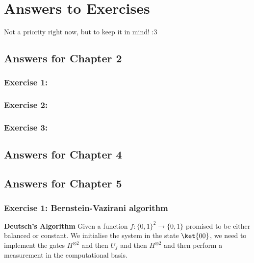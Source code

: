 \chapter{Answers to Exercises}
\label{chpt:answers}

Not a priority right now, but to keep it in mind! :3

\section{Answers for Chapter 2}

\subsection{Exercise 1:}
\subsection{Exercise 2:}
\subsection{Exercise 3:}

\newpage
\section{Answers for Chapter 4}

\newpage
\section{Answers for Chapter 5}


\subsection{Exercise 1: Bernstein-Vazirani algorithm}

\begin{tcolorbox}[standard jigsaw,
    opacityback=0,  %
    boxrule=0.5pt]
    {\bf Deutsch's Algorithm}
    \tcbline
    Given a function $f:\{0,1\}^2\rightarrow \{0,1\}$ promised to be either balanced or constant. We initialise the system in the state $\ket{00}$, we need to implement the gates $H^{\otimes 2}$ and then $U_f$ and then $H^{\otimes 2}$ and then perform a measurement in the computational basis.
\end{tcolorbox}

